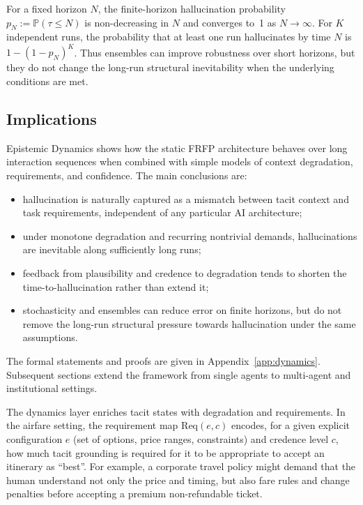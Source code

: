 For a fixed horizon \(N\), the finite-horizon hallucination probability
\(p_N:=\mathbb{P}(\tau\le N)\) is non-decreasing in \(N\) and converges
to~1 as \(N\to\infty\). For \(K\) independent runs, the probability that
at least one run hallucinates by time \(N\) is
\(1-(1-p_N)^K\). Thus ensembles can improve robustness over short
horizons, but they do not change the long-run structural inevitability
when the underlying conditions are met.

\subsection{Implications}

Epistemic Dynamics shows how the static FRFP architecture behaves over long
interaction sequences when combined with simple models of context
degradation, requirements, and confidence. The main conclusions are:
\begin{itemize}[leftmargin=2em]
  \item hallucination is naturally captured as a mismatch between tacit
        context and task requirements, independent of any particular AI
        architecture;
  \item under monotone degradation and recurring nontrivial demands,
        hallucinations are inevitable along sufficiently long runs;
  \item feedback from plausibility and credence to degradation tends to
        shorten the time-to-hallucination rather than extend it;
  \item stochasticity and ensembles can reduce error on finite horizons,
        but do not remove the long-run structural pressure towards
        hallucination under the same assumptions.
\end{itemize}

The formal statements and proofs are given in
Appendix~\ref{app:dynamics}. Subsequent sections extend the
framework from single agents to multi-agent and institutional settings.

The dynamics layer enriches tacit states with degradation and requirements. In the airfare setting, the requirement map \(\mathrm{Req}(e,c)\) encodes, for a given explicit configuration \(e\) (set of options, price ranges, constraints) and credence level \(c\), how much tacit grounding is required for it to be appropriate to accept an itinerary as ``best''. For example, a corporate travel policy might demand that the human understand not only the price and timing, but also fare rules and change penalties before accepting a premium non-refundable ticket.

